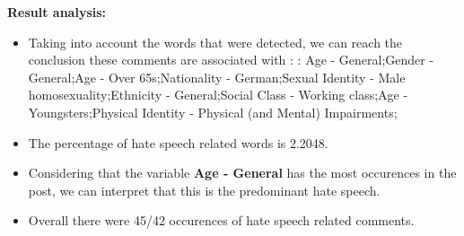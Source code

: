 \documentclass[11pt]{article}
\begin{document}
\textbf{\Large Result analysis:}

\begin{itemize}\item Taking into account the words that were detected, we can reach the conclusion these comments are associated with : : Age - General;Gender - General;Age - Over 65s;Nationality - German;Sexual Identity - Male homosexuality;Ethnicity - General;Social Class - Working class;Age - Youngsters;Physical Identity - Physical (and Mental) Impairments;%

\item The percentage of hate speech related words is 2.2048.

\item Considering that the variable \textbf{Age - General} has the most occurences in the post, we can interpret that this is the predominant hate speech.

\item Overall there were 45/42 occurences of hate speech related comments.\end{itemize}
\end{document}
